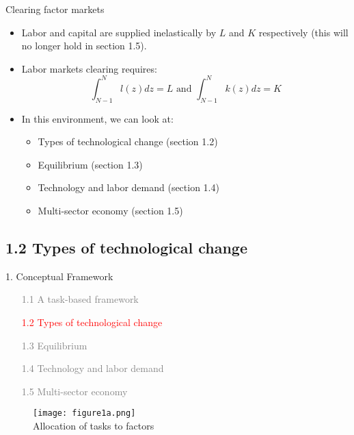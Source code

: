 \documentclass[notes=show]{beamer}
\begin{document}
\begin{frame}{Clearing factor markets}
\begin{itemize}
\item Labor and capital are supplied inelastically by $L$ and $K$ respectively (this will no longer hold in section 1.5). \medskip
\item Labor markets clearing requires:
\[
\int_{N-1}^{N} l(z)dz = L \text{ and } \int_{N-1}^{N} k(z)dz = K
\]
\item In this environment, we can look at: \medskip
\begin{itemize}
\item Types of technological change (section 1.2) \medskip
\item Equilibrium (section 1.3) \medskip
\item Technology and labor demand (section 1.4) \medskip
\item Multi-sector economy (section 1.5)
\end{itemize}
\end{itemize}
\end{frame}

\subsection{1.2 Types of technological change}

\begin{frame}{1. Conceptual Framework}
\begin{itemize}
\item[\textcolor{gray}{1.1}] \textcolor{gray}{A task-based framework} \bigskip
\item[\textcolor{red}{1.2}] \textcolor{red}{Types of technological change} \bigskip
\item[\textcolor{gray}{1.3}] \textcolor{gray}{Equilibrium} \bigskip
\item[\textcolor{gray}{1.4}] \textcolor{gray}{Technology and labor demand} \bigskip
\item[\textcolor{gray}{1.5}] \textcolor{gray}{Multi-sector economy} 
\end{itemize}
\end{frame}

\newpage
\begin{center}
\begin{figure}
\texttt{[image: figure1a.png]}
\\ Allocation of tasks to factors
\end{figure} 
\end{center}
\newpage
\end{document}
